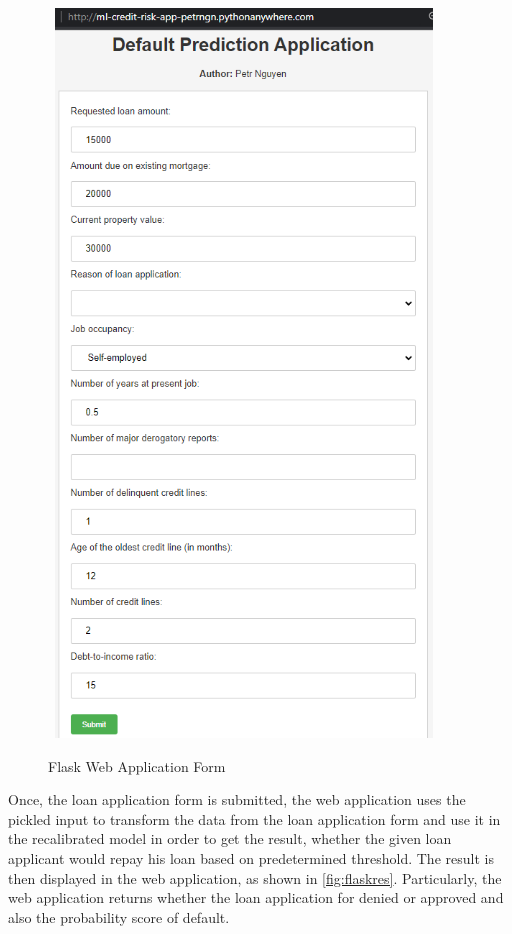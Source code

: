\begin{figure}[H]
    \centering
    \caption{Flask Web Application Form}\vspace{0.5em}
    \label{fig:flaskform}\
    \includegraphics[width=100mm]{Figures/flask_app_form.jpg}

    \vspace{-1em}
\end{figure}
\clearpage

Once, the loan application form is submitted, the web application uses the pickled input to transform the data from the loan application form and use it in the recalibrated model in order to get the result, whether the given loan applicant would repay his loan based on predetermined threshold. The result is then displayed in the web application, as shown in \autoref{fig:flaskres}.
Particularly, the web application returns whether the loan application for denied or approved and also the probability score of default.


